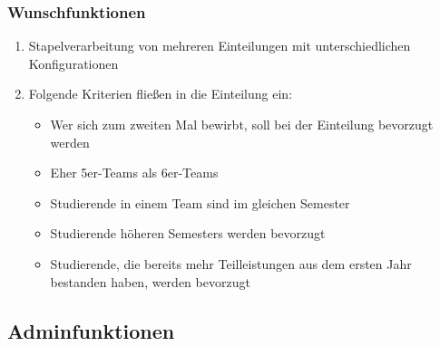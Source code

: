 \documentclass[parskip=full]{scrartcl}
\newcommand{\swtLabel}[1]{\textbf{/#1\arabic*0/}}
\begin{document}
\subsubsection{Wunschfunktionen}
\begin{enumerate}[label=\swtLabel{FA}, resume]
  \item Stapelverarbeitung von mehreren Einteilungen mit unterschiedlichen Konfigurationen
\item Folgende Kriterien fließen in die Einteilung ein:
\begin{itemize}
  \item Wer sich zum zweiten Mal bewirbt, soll bei der Einteilung bevorzugt
  werden
  \item Eher 5er-Teams als 6er-Teams
  \item Studierende in einem Team sind im gleichen Semester
  \item Studierende höheren Semesters werden bevorzugt
  \item Studierende, die bereits mehr Teilleistungen aus dem ersten Jahr bestanden
haben, werden bevorzugt
\end{itemize}
\end{enumerate}
\subsection{Adminfunktionen}
\end{document}
